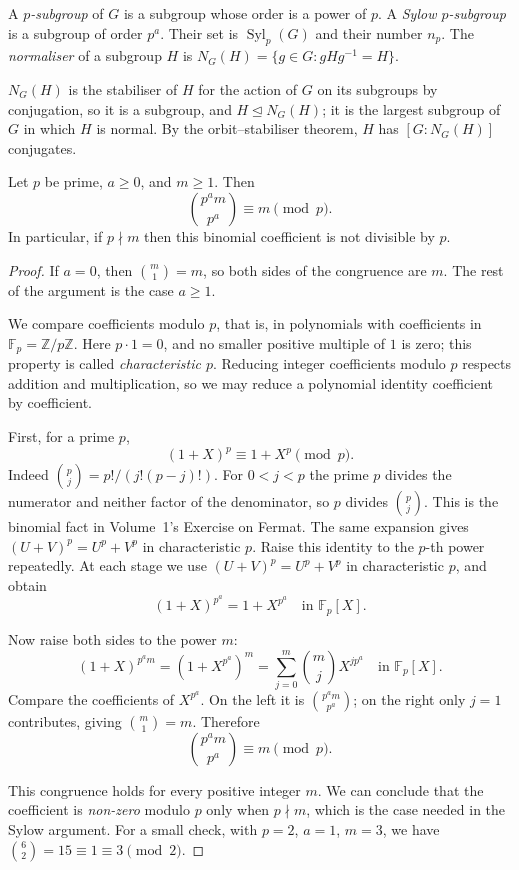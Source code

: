 \begin{definition}
A \emph{$p$-subgroup} of $G$ is a subgroup whose order is a power of $p$. A \emph{Sylow $p$-subgroup} is a subgroup of order $p^a$. Their set is $\operatorname{Syl}_p(G)$ and their number $n_p$. The \emph{normaliser} of a subgroup $H$ is $N_G(H)=\{g\in G:gHg^{-1}=H\}$.
\end{definition}

$N_G(H)$ is the stabiliser of $H$ for the action of $G$ on its subgroups by conjugation, so it is a subgroup, and $H\trianglelefteq N_G(H)$; it is the largest subgroup of $G$ in which $H$ is normal. By the orbit--stabiliser theorem, $H$ has $[G:N_G(H)]$ conjugates.

\begin{lemma}\label{lem:binom}
Let $p$ be prime, $a\ge0$, and $m\ge1$. Then
\[
\binom{p^am}{p^a}\equiv m\pmod p.
\]
In particular, if $p\nmid m$ then this binomial coefficient is not divisible by $p$.
\end{lemma}
\begin{proof}
If $a=0$, then $\binom{m}{1}=m$, so both sides of the congruence are $m$. The rest of the argument is the case $a\ge1$.

We compare coefficients modulo $p$, that is, in polynomials with
coefficients in $\mathbb F_p=\mathbb Z/p\mathbb Z$. Here $p\cdot1=0$,
and no smaller positive multiple of $1$ is zero; this property is called
\emph{characteristic $p$}. Reducing integer coefficients modulo $p$
respects addition and multiplication, so we may reduce a polynomial
identity coefficient by coefficient.

First, for a prime $p$,
\[
(1+X)^p\equiv1+X^p\pmod p.
\]
Indeed $\binom pj=p!/(j!(p-j)!)$. For $0<j<p$ the prime $p$ divides the numerator and neither factor of the denominator, so $p$ divides $\binom pj$. This is the binomial fact in Volume~1's Exercise on Fermat. The same expansion gives $(U+V)^p=U^p+V^p$ in characteristic $p$.
Raise this identity to the $p$-th power
repeatedly. At each stage we use
$(U+V)^p=U^p+V^p$ in characteristic $p$,
and obtain
\[
(1+X)^{p^a}=1+X^{p^a}
\quad\text{in }\mathbb F_p[X].
\]

Now raise both sides to the power $m$:
\[
(1+X)^{p^am}
=(1+X^{p^a})^m
=\sum_{j=0}^m\binom mjX^{jp^a}
\quad\text{in }\mathbb F_p[X].
\]
Compare the coefficients of $X^{p^a}$.
On the left it is $\binom{p^am}{p^a}$;
on the right only $j=1$ contributes, giving
$\binom m1=m$. Therefore
\[
\boxed{\binom{p^am}{p^a}\equiv m\pmod p}.
\]

This congruence holds for every positive integer $m$.
We can conclude that the coefficient is \emph{non-zero}
modulo $p$ only when $p\nmid m$, which is
the case needed in the Sylow argument.
For a small check, with $p=2$, $a=1$, $m=3$,
we have $\binom62=15\equiv1\equiv3\pmod2$.
\end{proof}

